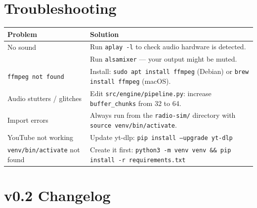 \documentclass[11pt,a4paper]{article}
\begin{document}
\section{Troubleshooting}

\begin{tabularx}{\textwidth}{@{}>{\raggedright\arraybackslash}p{4cm} X@{}}
    \toprule
    \textbf{Problem} & \textbf{Solution} \\
    \midrule
    No sound &
    Run \texttt{aplay -l} to check audio hardware is detected. \\
    & Run \texttt{alsamixer} --- your output might be muted. \\
    \addlinespace
    \texttt{ffmpeg not found} &
    Install: \texttt{sudo apt install ffmpeg} (Debian) or \texttt{brew install ffmpeg} (macOS). \\
    \addlinespace
    Audio stutters / glitches &
    Edit \texttt{src/engine/pipeline.py}: increase \texttt{buffer\_chunks} from 32 to 64. \\
    \addlinespace
    Import errors &
    Always run from the \texttt{radio-sim/} directory with \texttt{source venv/bin/activate}. \\
    \addlinespace
    YouTube not working &
    Update yt-dlp: \texttt{pip install --upgrade yt-dlp} \\
    \addlinespace
    \texttt{venv/bin/activate} not found &
    Create it first: \texttt{python3 -m venv venv \&\& pip install -r requirements.txt} \\
    \bottomrule
\end{tabularx}

\section*{v0.2 Changelog}
\end{document}

